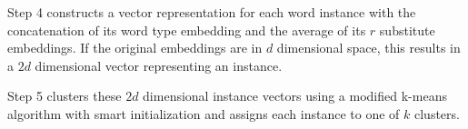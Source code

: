 Step 4 constructs a vector representation for each word instance with the
concatenation of its word type embedding and the average of its $r$ substitute
embeddings.  If the original embeddings are in $d$ dimensional space, this
results in a $2d$ dimensional vector representing an instance.

Step 5 clusters these $2d$ dimensional instance vectors using a
modified k-means algorithm with smart initialization
\cite{arthur2007k} and assigns each instance to one of $k$ clusters.



